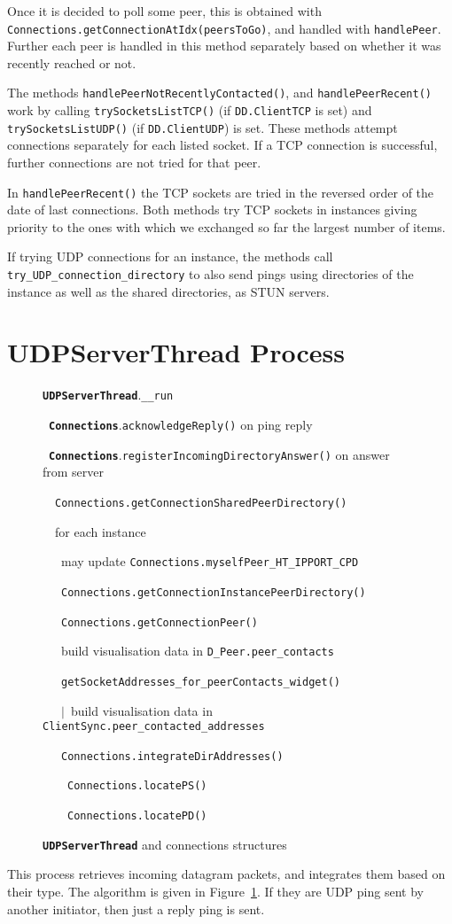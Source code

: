 \documentclass{book}
\newcommand{\cls}[1]{{\tt\bf #1}}
\newcommand{\mth}[1]{{\tt #1}}
\newcommand{\mmb}[1]{{\tt #1}}
\begin{document}
Once it is decided to poll some peer, this is obtained with \mth{Connections.getConnectionAtIdx(peersToGo)},
and handled with \mth{handlePeer}. Further each peer is handled in this method separately based on whether it was
recently reached or not.

The methods \mth{handlePeerNotRecentlyContacted()}, and \mth{handlePeerRecent()} work by calling 
\mth{trySocketsListTCP()} (if \mmb{DD.ClientTCP} is set) and \mth{trySocketsListUDP()} (if \mmb{DD.ClientUDP})
is set. 
These methods attempt connections separately for each listed socket. 
If a TCP connection is successful, further connections are not tried for that peer.

In \mth{handlePeerRecent()}  the TCP sockets
are tried in the reversed order of the date of last connections. 
Both methods try TCP sockets in instances giving priority to the ones with which we exchanged
so far the largest number of items.

If trying UDP connections for an instance, the methods call \mth{try\_UDP\_connection\_directory} to also 
send pings using directories of the instance as well as the shared directories, as STUN servers.

\section{UDPServerThread Process}

\begin{figure}[!ht]
\noindent
\strut\cls{UDPServerThread}.\mth{\_\_run} \\
\strut~\cls{Connections}.\mth{acknowledgeReply()} on ping reply\\
\strut~\cls{Connections}.\mth{registerIncomingDirectoryAnswer()} on answer from server\\
\strut~~\mth{Connections.getConnectionSharedPeerDirectory()}\\
\strut~~for each instance\\
\strut~~~may update \mth{Connections.myselfPeer\_HT\_IPPORT\_CPD}\\
\strut~~~\mth{Connections.getConnectionInstancePeerDirectory()}\\
\strut~~~\mth{Connections.getConnectionPeer()} \\
\strut~~~build visualisation data in \mmb{D\_Peer.peer\_contacts} \\
\strut~~~\mth{getSocketAddresses\_for\_peerContacts\_widget()} \\
\strut~~~$|$~build visualisation data in \mmb{ClientSync.peer\_contacted\_addresses} \\
\strut~~~\mth{Connections.integrateDirAddresses()} \\
\strut~~~~\mth{Connections.locatePS()} \\
\strut~~~~\mth{Connections.locatePD()} \\
\caption{\cls{UDPServerThread} and connections structures}\label{fig:conn_udpserver}
\end{figure}
This process retrieves incoming datagram packets, and integrates them based on their type. The
algorithm is given in Figure~\ref{fig:conn_udpserver}.
If they are UDP ping sent by another initiator, then just a reply ping is sent.
\end{document}
